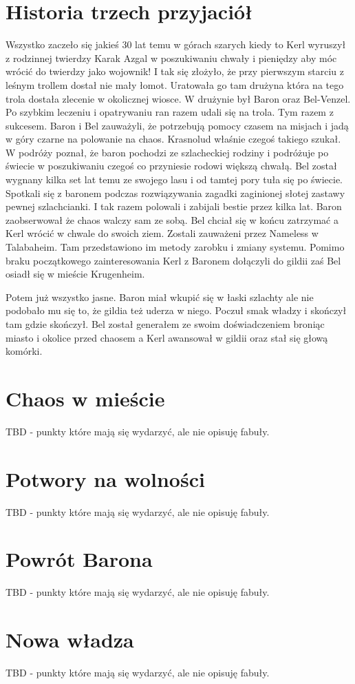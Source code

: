 \documentclass{article}
\begin{document}
\section*{Historia trzech przyjaciół}
    Wszystko zaczeło się jakieś 30 lat temu w górach szarych kiedy to Kerl wyruszył z rodzinnej twierdzy Karak Azgal w poszukiwaniu chwały i pieniędzy aby móc wrócić do twierdzy jako wojownik! I tak się złożyło, że przy pierwszym starciu z leśnym trollem dostał nie mały łomot. Uratowała go tam drużyna która na tego trola dostała zlecenie w okolicznej wiosce. W drużynie był Baron oraz Bel-Venzel. Po szybkim leczeniu i opatrywaniu ran razem udali się na trola. Tym razem z sukcesem. Baron i Bel zauważyli, że potrzebują pomocy czasem na misjach i jadą w góry czarne na polowanie na chaos. Krasnolud właśnie czegoś takiego szukał. W podróży poznał, że baron pochodzi ze szlacheckiej rodziny i podróżuje po świecie w poszukiwaniu czegoś co przyniesie rodowi większą chwałą. Bel został wygnany kilka set lat temu ze swojego lasu i od tamtej pory tuła się po świecie. Spotkali się z baronem podczas rozwiązywania zagadki zaginionej słotej zastawy pewnej szlachcianki. I tak razem polowali i zabijali bestie przez kilka lat. Baron zaobserwował że chaos walczy sam ze sobą. Bel chciał się w końcu zatrzymać a Kerl wrócić w chwale do swoich ziem. Zostali zauważeni przez Nameless w Talabaheim. Tam przedstawiono im metody zarobku i zmiany systemu. Pomimo braku początkowego zainteresowania Kerl z Baronem dołączyli do gildii zaś Bel osiadł się w mieście Krugenheim.

    Potem już wszystko jasne. Baron miał wkupić się w łaski szlachty ale nie podobało mu się to, że gildia też uderza w niego. Poczuł smak władzy i skończył tam gdzie skończył. Bel został generałem ze swoim doświadczeniem broniąc miasto i okolice przed chaosem a Kerl awansował w gildii oraz stał się głową komórki.

\section*{Chaos w mieście}

    TBD - punkty które mają się wydarzyć, ale nie opisuję fabuły.

\section*{Potwory na wolności}

    TBD - punkty które mają się wydarzyć, ale nie opisuję fabuły.

\section*{Powrót Barona}

    TBD - punkty które mają się wydarzyć, ale nie opisuję fabuły.

\section*{Nowa władza}

    TBD - punkty które mają się wydarzyć, ale nie opisuję fabuły.
\end{document}
